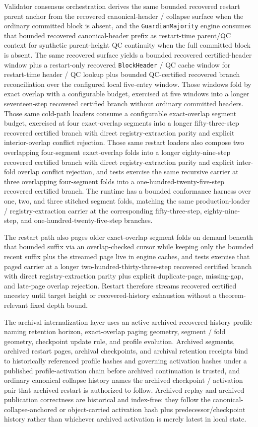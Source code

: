 \documentclass[11pt]{article}
\newcommand{\code}[1]{\texttt{#1}}
\begin{document}
Validator consensus orchestration derives the same bounded recovered restart
parent anchor from the recovered canonical-header / collapse surface when the
ordinary committed block is absent, and the \code{GuardianMajority} engine
consumes that bounded recovered canonical-header prefix as restart-time
parent/QC context for synthetic parent-height QC continuity when the full
committed block is absent. The same recovered surface yields a bounded
recovered certified-header window plus a restart-only recovered
\code{BlockHeader} / QC cache window for restart-time header / QC lookup plus
bounded QC-certified recovered branch reconciliation over the configured local
five-entry window. Those windows fold by exact overlap with a configurable
budget, exercised at five windows into a longer seventeen-step recovered
certified branch without ordinary committed headers. Those same cold-path
loaders consume a configurable exact-overlap segment budget, exercised at four
exact-overlap segments into a longer fifty-three-step recovered certified
branch with direct registry-extraction parity and explicit interior-overlap
conflict rejection. Those same restart loaders also compose two overlapping
four-segment exact-overlap folds into a longer eighty-nine-step recovered
certified branch with direct registry-extraction parity and explicit inter-fold
overlap conflict rejection, and tests exercise the same recursive carrier at
three overlapping four-segment folds into a one-hundred-twenty-five-step
recovered certified branch. The runtime has a bounded conformance harness over
one, two, and three stitched segment folds, matching the same production-loader
/ registry-extraction carrier at the corresponding fifty-three-step,
eighty-nine-step, and one-hundred-twenty-five-step branches.

The restart path also pages older exact-overlap segment folds on demand beneath
that bounded suffix via an overlap-checked cursor while keeping only the
bounded recent suffix plus the streamed page live in engine caches, and tests
exercise that paged carrier at a longer two-hundred-thirty-three-step
recovered certified branch with direct registry-extraction parity plus explicit
duplicate-page, missing-gap, and late-page overlap rejection. Restart
therefore streams recovered certified ancestry until target height or
recovered-history exhaustion without a theorem-relevant fixed depth bound.

The archival internalization layer uses an active archived-recovered-history
profile naming retention horizon, exact-overlap paging geometry, segment /
fold geometry, checkpoint update rule, and profile evolution. Archived
segments, archived restart pages, archival checkpoints, and archival retention
receipts bind to historically referenced profile hashes and governing
activation hashes under a published profile-activation chain before archived
continuation is trusted, and ordinary canonical collapse history names the
archived checkpoint / activation pair that archived restart is authorized to
follow. Archived replay and archived publication correctness are historical and
index-free: they follow the canonical-collapse-anchored or object-carried
activation hash plus predecessor/checkpoint history rather than whichever
archived activation is merely latest in local state.
\end{document}
